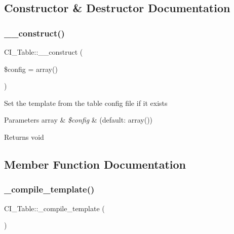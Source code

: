 \subsection{Constructor \& Destructor Documentation}
\mbox{\label{class_c_i___table_aafb01706a8d4082ff7fbf35b3efae4d5}} 
\subsubsection{\texorpdfstring{\+\_\+\+\_\+construct()}{\_\_construct()}}
{\footnotesize\ttfamily C\+I\+\_\+\+Table\+::\+\_\+\+\_\+construct (\begin{DoxyParamCaption}\item[{}]{\$config = {\ttfamily array()} }\end{DoxyParamCaption})}

Set the template from the table config file if it exists


\begin{DoxyParams}[1]{Parameters}
array & {\em \$config} & (default\+: array()) \\
\hline
\end{DoxyParams}
\begin{DoxyReturn}{Returns}
void 
\end{DoxyReturn}


\subsection{Member Function Documentation}
\mbox{\label{class_c_i___table_afc336bcb2396eddb9e45a1d9e481b418}} 
\subsubsection{\texorpdfstring{\+\_\+compile\+\_\+template()}{\_compile\_template()}}
{\footnotesize\ttfamily C\+I\+\_\+\+Table\+::\+\_\+compile\+\_\+template (\begin{DoxyParamCaption}{ }\end{DoxyParamCaption})\hspace{0.3cm}{\ttfamily [protected]}}

